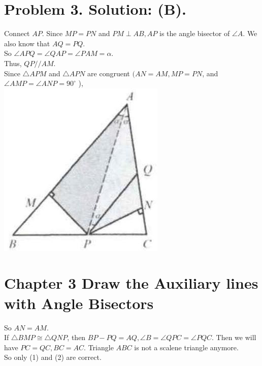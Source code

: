 \documentclass[10pt]{article}
\begin{document}
\section*{Problem 3. Solution: (B).}
Connect \(A P\). Since \(M P=P N\) and \(P M \perp A B, A P\) is the angle bisector of \(\angle A\). We also know that \(A Q=P Q\).\\
So \(\angle A P Q=\angle Q A P=\angle P A M=\alpha\).\\
Thus, \(Q P / / A M\).\\
Since \(\triangle A P M\) and \(\triangle A P N\) are congruent \((A N=A M, M P=P N\), and \(\angle A M P=\angle A N P=90^{\circ}\) ),\\
\includegraphics[max width=\textwidth, center]{2025_04_17_97bc1f7e44d93c271a88g-067(1)}

\section*{Chapter 3 Draw the Auxiliary lines with Angle Bisectors}
So \(A N=A M\).\\
If \(\triangle B M P \cong \triangle Q N P\), then \(B P-P Q=A Q, \angle B=\angle Q P C=\angle P Q C\). Then we will have \(P C=Q C, B C=A C\). Triangle \(A B C\) is not a scalene triangle anymore.\\
So only (1) and (2) are correct.
\end{document}
